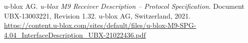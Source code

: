 \documentclass[../DoAn.tex]{subfiles}
\begin{document}
\begin{thebibliography}{9}
u-blox AG. \textit{u-blox M9 Receiver Description – Protocol Specification}. Document UBX-13003221, Revision 1.32. u-blox AG, Switzerland, 2021.\\
\url{https://content.u-blox.com/sites/default/files/u-blox-M9-SPG-4.04_InterfaceDescription_UBX-21022436.pdf}
\end{thebibliography}
\end{document}
